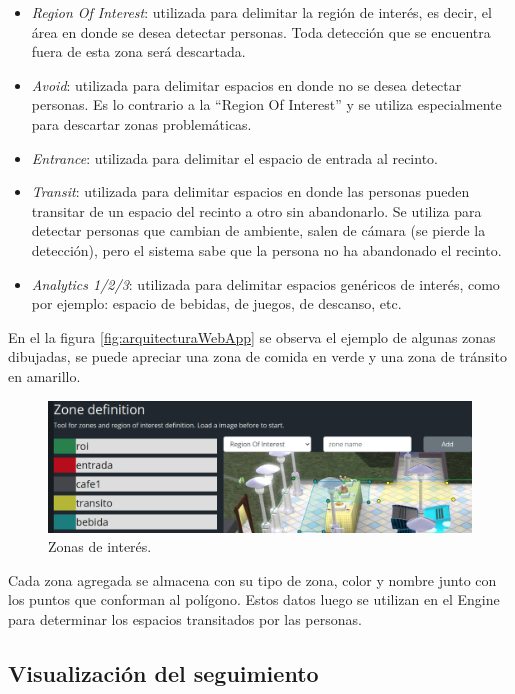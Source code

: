 \begin{itemize}
\item \textit{Region Of Interest}: utilizada para delimitar la región de interés, es decir, el área en donde se desea detectar personas. Toda detección que se encuentra fuera de esta zona será descartada.
\item \textit{Avoid}: utilizada para delimitar espacios en donde no se desea detectar personas. Es lo contrario a la ``Region Of Interest'' y se utiliza especialmente para descartar zonas problemáticas.
\item \textit{Entrance}: utilizada para delimitar el espacio de entrada al recinto.
\item \textit{Transit}: utilizada para delimitar espacios en donde las personas pueden transitar de un espacio del recinto a otro sin abandonarlo. Se utiliza para detectar personas que cambian de ambiente, salen de cámara (se pierde la detección), pero el sistema sabe que la persona no ha abandonado el recinto.
\item \textit{Analytics 1/2/3}: utilizada para delimitar espacios genéricos de interés, como por ejemplo: espacio de bebidas, de juegos, de descanso, etc.
\end{itemize}

En el la figura \ref{fig:arquitecturaWebApp} se observa el ejemplo de algunas zonas dibujadas, se puede apreciar una zona de comida en verde y una zona de tránsito en amarillo.

\begin{figure}[ht]
	\centering
	\includegraphics[scale=.5]{./Figures/visualizacionZonas.png}
	\caption{Zonas de interés.}
	\label{fig:visualizacionZonas}
\end{figure}

Cada zona agregada se almacena con su tipo de zona, color y nombre junto con los puntos que conforman al polígono. Estos datos luego se utilizan en el Engine para determinar los espacios transitados por las personas.

\newpage

\subsection{Visualización del seguimiento}

